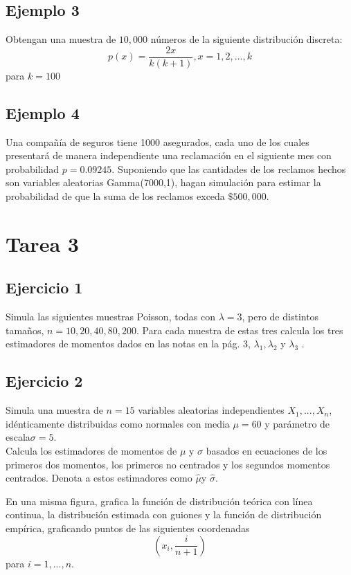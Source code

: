 \documentclass[10pt]{article}\usepackage[]{graphicx}\usepackage[]{xcolor}
\begin{document}
\subsection{Ejemplo 3}
Obtengan una muestra de $10,000$ números de la siguiente distribución discreta:
$$
p(x)=\frac{2 x}{k(k+1)}, x=1,2, \ldots, k
$$
para $k=100$


\subsection{Ejemplo 4}
Una compañía de seguros tiene 1000 asegurados, cada uno de los cuales presentará de manera independiente una reclamación en el siguiente mes con probabilidad $p = 0.09245$. Suponiendo que las cantidades de los reclamos hechos son variables aleatorias Gamma(7000,1), hagan simulación para estimar la probabilidad de que la suma de los reclamos exceda $\$ 500,000$.


\section{Tarea 3}
\subsection{Ejercicio 1}
Simula las siguientes muestras Poisson, todas con $\lambda = 3$, pero de distintos tamaños, $n = 10,20,40,80,200$. Para cada muestra de estas tres calcula los tres estimadores de momentos dados en las notas en la pág. 3, $\lambda_1 , \lambda_2$ y $\lambda_3$ .


\subsection{Ejercicio 2}
Simula una muestra de $n = 15$ variables aleatorias independientes $X_1, ..., X_n$, idénticamente distribuidas como normales con media $\mu = 60$ y parámetro de escala$ \sigma = 5$.\\

Calcula los estimadores de momentos de $\mu$ y $\sigma$ basados en ecuaciones de los primeros dos momentos, los primeros no centrados y los segundos momentos centrados. Denota a estos estimadores como $\hat{\mu}$y $\hat{\sigma}$.

En una misma figura, grafica la función de distribución teórica con línea continua, la distribución estimada con guiones y la función de distribución empírica, graficando puntos de las siguientes coordenadas
$$\left( x_i ,  \frac{i}{n+1} \right)$$
para $i=1,...,n$.
\end{document}
